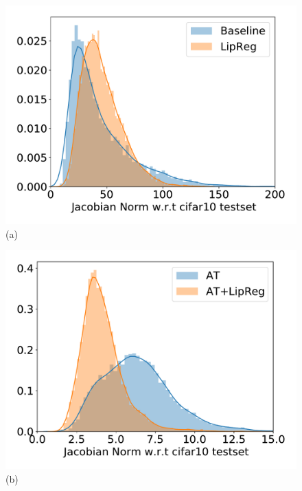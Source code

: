 \begin{figure}[htb]
  \centering
  \begin{minipage}{.24\linewidth}
    \centering
    \includegraphics[scale=0.16]{figures/chapter4/jacobian_distribution_v1.pdf}\\{(a)}
  \end{minipage}
  \hfill
  \begin{minipage}{.24\linewidth}
    \centering
    \includegraphics[scale=0.16]{figures/chapter4/jacobian_distribution_v2.pdf}\\{(b)}
  \end{minipage}
  \hfill
  \begin{minipage}{.24\linewidth}
    \centering

\end{minipage}
\end{figure}
